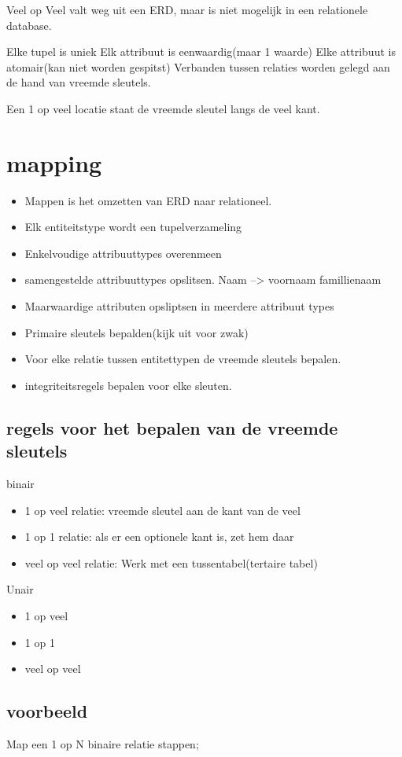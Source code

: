 \documentclass{article}
\begin{document}
 Veel op Veel valt weg uit een ERD, maar is niet mogelijk in een relationele database.

 Elke tupel is uniek
 Elk attribuut is eenwaardig(maar 1 waarde)
 Elke attribuut is atomair(kan niet worden gespitst)
 Verbanden tussen relaties worden gelegd aan de hand van vreemde sleutels.

 Een 1 op veel locatie staat de vreemde sleutel langs de veel kant.

 \section{mapping}
 \begin{itemize}
\item Mappen is het omzetten van ERD naar relationeel.
\item Elk entiteitstype wordt een tupelverzameling
\item Enkelvoudige attribuuttypes overenmeen
\item samengestelde attribuuttypes opslitsen. Naam --> voornaam famillienaam
\item Maarwaardige attributen opsliptsen in meerdere attribuut types
\item Primaire sleutels bepalden(kijk uit voor zwak)
\item Voor elke relatie tussen entitettypen de vreemde sleutels bepalen.
\item integriteitsregels bepalen voor elke sleuten.
\end{itemize}

\subsection{regels voor het bepalen van de vreemde sleutels}
binair
\begin{itemize}
	\item 1 op veel relatie: vreemde sleutel aan de kant van de veel
    	\item 1 op 1 relatie: als er een optionele kant is, zet hem daar
	\item veel op veel relatie: Werk met een tussentabel(tertaire tabel)
\end{itemize}
Unair
\begin{itemize}

	\item 1 op veel
	\item 1 op 1
	\item veel op veel
\end{itemize}
\subsection{voorbeeld}
Map een 1 op N binaire relatie
stappen;
\end{document}
